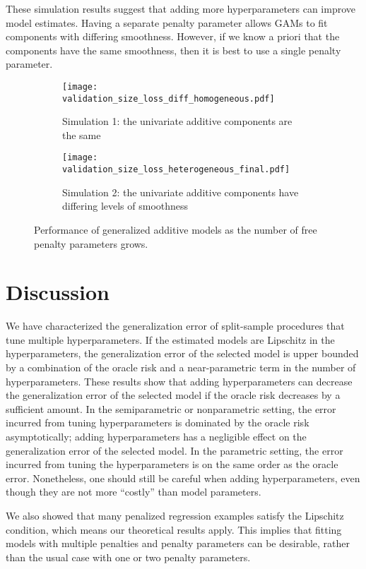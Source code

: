 \documentclass[12pt]{article} %
\theoremstyle{definition}
\begin{document}
These simulation results suggest that adding more hyperparameters can improve model estimates.
Having a separate penalty parameter allows GAMs to fit components with differing smoothness.
However, if we know a priori that the components have the same smoothness, then it is best to use a single penalty parameter.

\begin{figure}
	\centering
	\begin{subfigure}{0.6\textwidth}
		\texttt{[image: validation\_size\_loss\_diff\_homogeneous.pdf]}
		\caption{Simulation 1: the univariate additive components are the same}
	\end{subfigure}
	\begin{subfigure}{0.6\textwidth}
		\texttt{[image: validation\_size\_loss\_heterogeneous\_final.pdf]}
		\caption{Simulation 2: the univariate additive components have differing levels of smoothness}
	\end{subfigure}
	\caption{
		Performance of generalized additive models as the number of free penalty parameters grows.
	}
	\label{fig:simulations}
\end{figure}

\section{Discussion}\label{sec:discussion}

We have characterized the generalization error of split-sample procedures that tune multiple hyperparameters.
If the estimated models are Lipschitz in the hyperparameters, the generalization error of the selected model is upper bounded by a combination of the oracle risk and a near-parametric term in the number of hyperparameters.
These results show that adding hyperparameters can decrease the generalization error of the selected model if the oracle risk decreases by a sufficient amount.
In the semiparametric or nonparametric setting, the error incurred from tuning hyperparameters is dominated by the oracle risk asymptotically; adding hyperparameters has a negligible effect on the generalization error of the selected model.
In the parametric setting, the error incurred from tuning the hyperparameters is on the same order as the oracle error.
Nonetheless, one should still be careful when adding hyperparameters, even though they are not more ``costly'' than model parameters.

We also showed that many penalized regression examples satisfy the Lipschitz condition, which means our theoretical results apply.
This implies that fitting models with multiple penalties and penalty parameters can be desirable, rather than the usual case with one or two penalty parameters.
\end{document}
